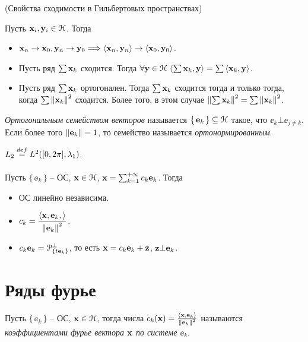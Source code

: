 \begin{theorem}(Свойства сходимости в Гильбертовых пространствах)

    Пусть $\mathbf{x}_i, \mathbf{y}_i \in \mathcal{H}$. Тогда
    \begin{itemize}
        \item $\mathbf{x}_n \to \mathbf{x}_0, \mathbf{y}_n \to \mathbf{y}_0 \Longrightarrow \langle \mathbf{x}_n, \mathbf{y}_n \rangle \to \langle \mathbf{x}_0, \mathbf{y}_0 \rangle$.
        \item Пусть ряд $\sum{\mathbf{x}_k}$ сходится. Тогда $\forall \mathbf{y} \in \mathcal{H}~ \langle \sum{\mathbf{x}_k}, \mathbf{y} \rangle 
            = \sum{\langle \mathbf{x}_k, \mathbf{y}\rangle}$.
        \item Пусть ряд $\sum{\mathbf{x}_k}$ ортогонален. Тогда $\sum{\mathbf{x}_k}$ сходится тогда и только тогда,
            когда $\sum{\left\lVert\mathbf{x}_k\right\rVert^2}$ сходится. Более того, в этом случае
            $\left\lVert\sum{\mathbf{x}_k}\right\rVert^2 = \sum{\left\lVert\mathbf{x}_k\right\rVert^2}$.
    \end{itemize} 
\end{theorem}

\begin{definition}
    \textit{Ортогональным семейством векторов} называется $\{\,\mathbf{e}_k\,\} \subseteq \mathcal{H}$
    такое, что $\ee_k \bot \ee_{j \neq k}$. Если более того $\left\lVert\mathbf{e}_k\right\rVert = 1$, то
    семейство называется \textit{ортонормированным}.
\end{definition}

\begin{definition}
    $L_2 \overset{def}{\underset{}{=}} L^2([0, 2\pi], \lambda_1)$.
\end{definition}

\begin{theorem}
    Пусть $\{\,\ee_k\,\}$ -- ОС, $\mathbf{x} \in \mathcal{H}$, $\mathbf{x} = \sum_{k = 1}^{+\infty}{c_k \mathbf{e}_k}$.
    Тогда
    \begin{itemize}
        \item ОС линейно независима.
        \item $\displaystyle c_k = \frac{\scp{\ex, \ee_k}}{\norm{\ee_k}^2}$.
        \item $\displaystyle c_k \mathbf{e}_k = \mathcal{P}^{\bot}_{\{t \mathbf{e}_k\}}$, 
            то есть $\mathbf{x} = c_k \mathbf{e}_k + \mathbf{z}$, $\mathbf{z} \bot \mathbf{e}_k$.
    \end{itemize} 
\end{theorem}

\section{Ряды фурье}

\begin{definition}
    Пусть $\{\,\ee_k\,\}$ -- ОС, $\mathbf{x} \in \mathcal{H}$, тогда числа
    $c_k(\mathbf{x}) = \frac{\langle \mathbf{x}, \mathbf{e}_k \rangle}{\left\lVert\mathbf{e}_k\right\rVert^2}$ называются 
    \textit{коэффициентами фурье вектора $\mathbf{x}$ по системе $\ee_k$}.
\end{definition}

